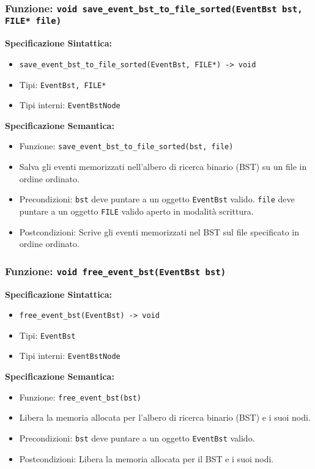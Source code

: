 \documentclass[11pt]{scrartcl} %
\begin{document}
\subsubsection{Funzione: \texttt{void save\_event\_bst\_to\_file\_sorted(EventBst bst, FILE* file)}}

\textbf{Specificazione Sintattica:}
\begin{itemize}
\item \texttt{save\_event\_bst\_to\_file\_sorted(EventBst, FILE*) -> void}
\item Tipi: \texttt{EventBst, FILE*}
\item Tipi interni: \texttt{EventBstNode}
\end{itemize}

\textbf{Specificazione Semantica:}
\begin{itemize}
\item Funzione: \texttt{save\_event\_bst\_to\_file\_sorted(bst, file)}
\item Salva gli eventi memorizzati nell'albero di ricerca binario (BST) su un file in ordine ordinato.
\item Precondizioni: \texttt{bst} deve puntare a un oggetto \texttt{EventBst} valido. \texttt{file} deve puntare a un oggetto \texttt{FILE} valido aperto in modalità scrittura.
\item Postcondizioni: Scrive gli eventi memorizzati nel BST sul file specificato in ordine ordinato.
\end{itemize}

\subsubsection{Funzione: \texttt{void free\_event\_bst(EventBst bst)}}

\textbf{Specificazione Sintattica:}
\begin{itemize}
\item \texttt{free\_event\_bst(EventBst) -> void}
\item Tipi: \texttt{EventBst}
\item Tipi interni: \texttt{EventBstNode}
\end{itemize}

\textbf{Specificazione Semantica:}
\begin{itemize}
\item Funzione: \texttt{free\_event\_bst(bst)}
\item Libera la memoria allocata per l'albero di ricerca binario (BST) e i suoi nodi.
\item Precondizioni: \texttt{bst} deve puntare a un oggetto \texttt{EventBst} valido.
\item Postcondizioni: Libera la memoria allocata per il BST e i suoi nodi.
\end{itemize}
\end{document}
